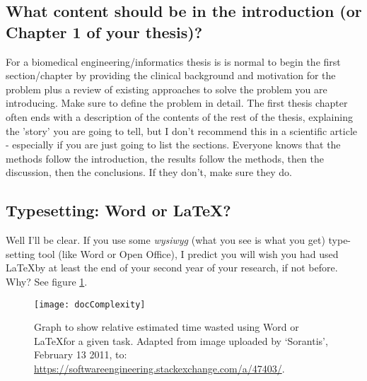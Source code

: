 \subsection{What content should be in the introduction (or Chapter 1 of your thesis)?}

For a biomedical engineering/informatics thesis is is normal to begin the first section/chapter by providing the clinical background and motivation for the problem plus a review of existing approaches to solve the problem you are introducing. Make sure to define the problem in detail. The first thesis chapter often ends with a description of the contents of the rest of the thesis, explaining the 'story' you are going to tell, but I don't recommend this in a scientific article - especially if you are just going to list the sections. Everyone knows that the methods follow the introduction, the results follow the methods, then the discussion, then the conclusions. If they don't, make sure they do.

\subsection{Typesetting: Word or \LaTeX?}


Well I'll be clear. If you use some {\it wysiwyg} (what you see is what you get) type-setting tool (like Word or Open Office), I predict you will wish you had used \LaTeX by at least the end of your second year of your research, if not before. Why? See figure \ref{fig:whylatex}.

\begin{figure}
\begin{centering}
\texttt{[image: docComplexity]}
\caption{\label{fig:whylatex}Graph to show relative estimated time wasted using Word or \LaTeX for a given task. Adapted from image uploaded by `Sorantis', February 13 2011, to: \url{https://softwareengineering.stackexchange.com/a/47403/}.}
\end{centering}
\end{figure}

